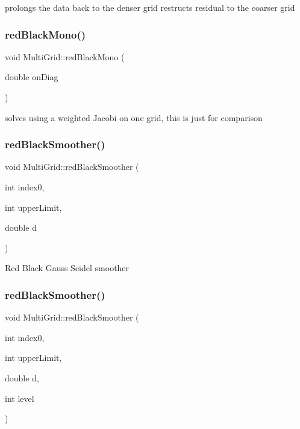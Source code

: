prolongs the data back to the denser grid restructs residual to the coarser grid \mbox{\label{classMultiGrid_ac50d33d6af2436397cba05e0eecc02c2}} 
\subsubsection{\texorpdfstring{red\+Black\+Mono()}{redBlackMono()}}
{\footnotesize\ttfamily void Multi\+Grid\+::red\+Black\+Mono (\begin{DoxyParamCaption}\item[{double}]{on\+Diag }\end{DoxyParamCaption})}

solves using a weighted Jacobi on one grid, this is just for comparison \mbox{\label{classMultiGrid_aadd3312395446c9d0a1dcad780205844}} 
\subsubsection{\texorpdfstring{red\+Black\+Smoother()}{redBlackSmoother()}\hspace{0.1cm}{\footnotesize\ttfamily [1/2]}}
{\footnotesize\ttfamily void Multi\+Grid\+::red\+Black\+Smoother (\begin{DoxyParamCaption}\item[{int}]{index0,  }\item[{int}]{upper\+Limit,  }\item[{double}]{d }\end{DoxyParamCaption})}

Red Black Gauss Seidel smoother \mbox{\label{classMultiGrid_ac392828b24eca28c66ba6a0937f1ef25}} 
\subsubsection{\texorpdfstring{red\+Black\+Smoother()}{redBlackSmoother()}\hspace{0.1cm}{\footnotesize\ttfamily [2/2]}}
{\footnotesize\ttfamily void Multi\+Grid\+::red\+Black\+Smoother (\begin{DoxyParamCaption}\item[{int}]{index0,  }\item[{int}]{upper\+Limit,  }\item[{double}]{d,  }\item[{int}]{level }\end{DoxyParamCaption})}

